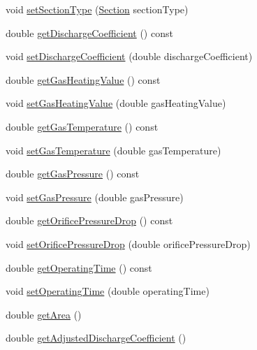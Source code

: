 \begin{DoxyCompactItemize}
\item 
void \hyperlink{class_flow_calculations_energy_use_add93257048914dbd920b6dc2be431b69}{set\+Section\+Type} (\hyperlink{class_flow_calculations_energy_use_afbabab0da698748de91369a5dfc7662a}{Section} section\+Type)
\item 
double \hyperlink{class_flow_calculations_energy_use_a28033765df3a220b5c7d75e34fd95c43}{get\+Discharge\+Coefficient} () const
\item 
void \hyperlink{class_flow_calculations_energy_use_aaa0b642f4cb22b3b74acd8a5d473a107}{set\+Discharge\+Coefficient} (double discharge\+Coefficient)
\item 
double \hyperlink{class_flow_calculations_energy_use_a42818c3f03cc70967eb6bb24094530a1}{get\+Gas\+Heating\+Value} () const
\item 
void \hyperlink{class_flow_calculations_energy_use_ae51a954fb1f44d6b114f66e69bdf754e}{set\+Gas\+Heating\+Value} (double gas\+Heating\+Value)
\item 
double \hyperlink{class_flow_calculations_energy_use_a9d5782d594530c0345ac3c8faff252b3}{get\+Gas\+Temperature} () const
\item 
void \hyperlink{class_flow_calculations_energy_use_a80db5465d8a0354da31a7f90c759ea1f}{set\+Gas\+Temperature} (double gas\+Temperature)
\item 
double \hyperlink{class_flow_calculations_energy_use_af98e97bce88915e6fdd7a0caf837049c}{get\+Gas\+Pressure} () const
\item 
void \hyperlink{class_flow_calculations_energy_use_a3b87a7c24340c618ed62ced5aece36b2}{set\+Gas\+Pressure} (double gas\+Pressure)
\item 
double \hyperlink{class_flow_calculations_energy_use_ac42e5918bba0c56406f39437317a2a87}{get\+Orifice\+Pressure\+Drop} () const
\item 
void \hyperlink{class_flow_calculations_energy_use_ad4b324ecd8288d44c32d622bb26b1bff}{set\+Orifice\+Pressure\+Drop} (double orifice\+Pressure\+Drop)
\item 
double \hyperlink{class_flow_calculations_energy_use_ab44c6cad4825e30f5599f18fcbfbb873}{get\+Operating\+Time} () const
\item 
void \hyperlink{class_flow_calculations_energy_use_ac82800d533502c7836238dcab1f39fac}{set\+Operating\+Time} (double operating\+Time)
\item 
double \hyperlink{class_flow_calculations_energy_use_a2cfdefc20dcc3d1c5b7d3d12e66b67ee}{get\+Area} ()
\item 
double \hyperlink{class_flow_calculations_energy_use_a16444682b7c914d18d8456bf399b8bd2}{get\+Adjusted\+Discharge\+Coefficient} ()

\end{DoxyCompactItemize}
